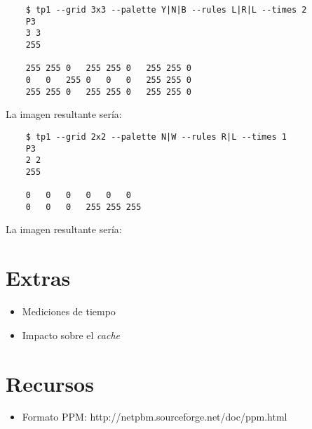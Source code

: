 \documentclass{article}
\begin{document}
    \begin{verbatim}
    $ tp1 --grid 3x3 --palette Y|N|B --rules L|R|L --times 2
    P3
    3 3
    255

    255 255 0   255 255 0   255 255 0
    0   0   255 0   0   0   255 255 0
    255 255 0   255 255 0   255 255 0
    \end{verbatim}
La imagen resultante sería:
\begin{center}
\end{center}

    \begin{verbatim}
    $ tp1 --grid 2x2 --palette N|W --rules R|L --times 1
    P3
    2 2
    255

    0   0   0   0   0   0 
    0   0   0   255 255 255
    \end{verbatim}

La imagen resultante sería:
\begin{center}
\end{center}

\section{Extras}
\begin{itemize}
\item Mediciones de tiempo
\item Impacto sobre el \textit{cache}
\end{itemize}

\section{Recursos}\label{Recursos}

\begin{itemize}
\item Formato PPM: http://netpbm.sourceforge.net/doc/ppm.html
\end{itemize}
\end{document}
